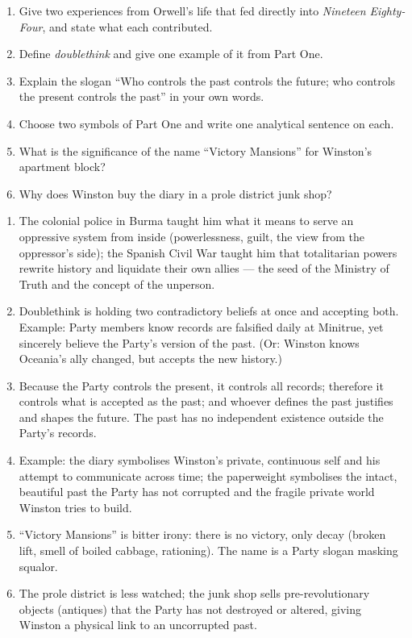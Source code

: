 \documentclass[11pt]{article}
\begin{document}
\begin{exercice}
\begin{enumerate}
\item Give two experiences from Orwell's life that fed directly into \emph{Nineteen Eighty-Four}, and state what each contributed.
\item Define \emph{doublethink} and give one example of it from Part One.
\item Explain the slogan ``Who controls the past controls the future; who controls the present controls the past'' in your own words.
\item Choose two symbols of Part One and write one analytical sentence on each.
\item What is the significance of the name ``Victory Mansions'' for Winston's apartment block?
\item Why does Winston buy the diary in a prole district junk shop?
\end{enumerate}
\end{exercice}

\begin{corrige}
\begin{enumerate}
\item The colonial police in Burma taught him what it means to serve an oppressive system from inside (powerlessness, guilt, the view from the oppressor's side); the Spanish Civil War taught him that totalitarian powers rewrite history and liquidate their own allies --- the seed of the Ministry of Truth and the concept of the unperson.
\item Doublethink is holding two contradictory beliefs at once and accepting both. Example: Party members know records are falsified daily at Minitrue, yet sincerely believe the Party's version of the past. (Or: Winston knows Oceania's ally changed, but accepts the new history.)
\item Because the Party controls the present, it controls all records; therefore it controls what is accepted as the past; and whoever defines the past justifies and shapes the future. The past has no independent existence outside the Party's records.
\item Example: the diary symbolises Winston's private, continuous self and his attempt to communicate across time; the paperweight symbolises the intact, beautiful past the Party has not corrupted and the fragile private world Winston tries to build.
\item ``Victory Mansions'' is bitter irony: there is no victory, only decay (broken lift, smell of boiled cabbage, rationing). The name is a Party slogan masking squalor.
\item The prole district is less watched; the junk shop sells pre-revolutionary objects (antiques) that the Party has not destroyed or altered, giving Winston a physical link to an uncorrupted past.
\end{enumerate}
\end{corrige}
\end{document}

